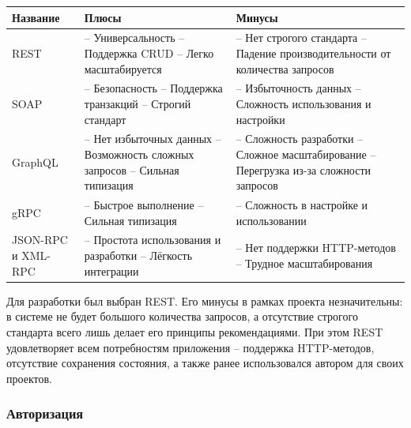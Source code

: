 \documentclass[a4paper,article]{article}
\begin{document}
\begin{sloppypar}
\begin{xltabular}{\textwidth} { |
            >{\hsize} X |
            >{\hsize} X |
            >{\hsize} X | }
        \hline
        Название
        & Плюсы
        & Минусы \\
        \hline
        REST
        & -- Универсальность \newline -- Поддержка CRUD \newline -- Легко масштабируется
        & -- Нет строгого стандарта \newline -- Падение производительности от количества запросов \\
        \hline
        SOAP
        & -- Безопасность \newline -- Поддержка транзакций \newline -- Строгий стандарт
        & -- Избыточность данных \newline -- Сложность использования и настройки \\
        \hline
        GraphQL
        & -- Нет избыточных данных \newline -- Возможность сложных запросов \newline -- Сильная типизация
        & -- Сложность разработки \newline -- Сложное масштабирование \newline -- Перегрузка из-за сложности запросов \\
        \hline
        gRPC
        & -- Быстрое выполнение \newline -- Сильная типизация
        & -- Сложность в настройке и использовании \\
        \hline
        JSON-RPC и XML-RPC
        & -- Простота использования и разработки \newline -- Лёгкость интеграции
        & -- Нет поддержки HTTP-методов \newline -- Трудное масштабирования \\
        \hline
    \end{xltabular}
    
    \newpage

    Для разработки был выбран REST. Его минусы в рамках проекта незначительны: в системе не будет большого количества запросов, а отсутствие строгого стандарта всего лишь делает его принципы рекомендациями. При этом REST удовлетворяет всем потребностям приложения -- поддержка HTTP-методов, отсутствие сохранения состояния, а также ранее использовался автором для своих проектов.

    \subsubsection{Авторизация}
    

\end{sloppypar}
\end{document}
